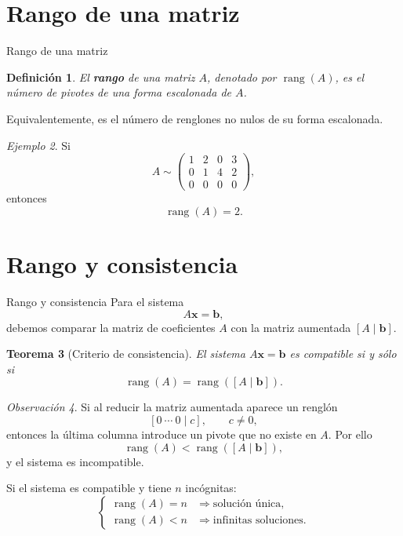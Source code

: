 \documentclass[aspectratio=169,9pt]{beamer}
\newtheorem{definicion}{Definición}[section]
\newtheorem{teorema}[definicion]{Teorema}
\theoremstyle{remark}
\newtheorem{observacion}[definicion]{Observación}
\newtheorem{ejemplo}[definicion]{Ejemplo}
\newcommand{\rank}{\operatorname{rang}}
\begin{document}
\section{Rango de una matriz}
\begin{frame}[allowframebreaks,t]{Rango de una matriz}
\begin{definicion}
El \textbf{rango} de una matriz $A$, denotado por $\rank(A)$, es el número de pivotes de una forma
escalonada de $A$.
\end{definicion}

Equivalentemente, es el número de renglones no nulos de su forma escalonada.

\begin{ejemplo}
Si
\[
A\sim
\begin{pmatrix}
1&2&0&3\\
0&1&4&2\\
0&0&0&0
\end{pmatrix},
\]
entonces
\[
\rank(A)=2.
\]
\end{ejemplo}
\end{frame}

\section{Rango y consistencia}
\begin{frame}[allowframebreaks,t]{Rango y consistencia}
Para el sistema
\[
A\mathbf{x}=\mathbf b,
\]
debemos comparar la matriz de coeficientes $A$ con la matriz aumentada $[A\mid\mathbf b]$.

\begin{teorema}[Criterio de consistencia]
El sistema $A\mathbf{x}=\mathbf b$ es compatible si y sólo si
\[
\rank(A)=\rank([A\mid\mathbf b]).
\]
\end{teorema}

\begin{observacion}
Si al reducir la matriz aumentada aparece un renglón
\[
[0\ \cdots\ 0\mid c],\qquad c\neq0,
\]
entonces la última columna introduce un pivote que no existe en $A$. Por ello
\[
\rank(A)<\rank([A\mid\mathbf b]),
\]
y el sistema es incompatible.
\end{observacion}

Si el sistema es compatible y tiene $n$ incógnitas:
\[
\begin{cases}
\rank(A)=n &\Longrightarrow \text{solución única},\\
\rank(A)<n &\Longrightarrow \text{infinitas soluciones}.
\end{cases}
\]
\end{frame}
\end{document}
